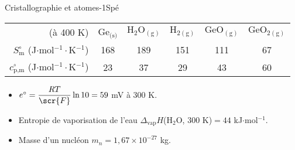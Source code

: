 \begin{exercise}{Cristallographie et atomes}{-1}{Spé}
\begin{center}
\medskip


\begin{tabular}{rccccc}
    \hline
    (à 400 K) & Ge$_\text{(s)}$ & $\mathrm{H_2O_{(g)}}$ & $\mathrm{H_{2 (g)}}$ & $\mathrm{GeO_{(g)}}$ & $\mathrm{GeO_{2 (g)}}$ \\
    $S_\text{m}^\circ$ (J$\cdot$mol$^{-1}\cdot$K$^{-1}$) & 168 & 189 & 151 & 111 & 67  \\
    $c_\text{p,m}^\circ$ (J$\cdot$mol$^{-1}\cdot$K$^{-1}$) & 23 & 37 & 29 & 43 & 60\\ \hline\hline 
\end{tabular}\end{center}
\begin{itemize}
    \item $e^\circ = \dfrac{RT}{\scr{F}} \ln10 = 59$ mV à 300 K.
    \item Entropie de vaporisation de l'eau $\Delta_\text{vap}H$(H$_2$O, 300 K)$ = 44$ kJ$\cdot$mol$^{-1}$.
    \item Masse d'un nucléon $m_n = 1,67\times 10^{-27}$ kg.
\end{itemize}

\end{exercise}